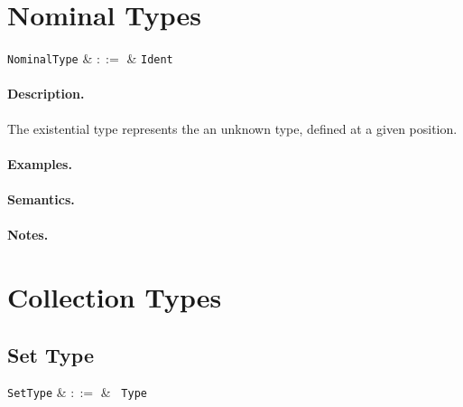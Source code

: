 
\section{Nominal Types}

\begin{syntax}
  \verb+NominalType+ & $::=$ & \verb+Ident+\\
\end{syntax}

\paragraph{Description.} The existential type represents the an
unknown type, defined at a given position.

\paragraph{Examples.}

\paragraph{Semantics.}

\paragraph{Notes.}


\section{Collection Types}


\subsection{Set Type}

\begin{syntax}
  \verb+SetType+ & $::=$ & \token{\{} \ \verb+Type+ \ \token{\}} \\
\end{syntax}

